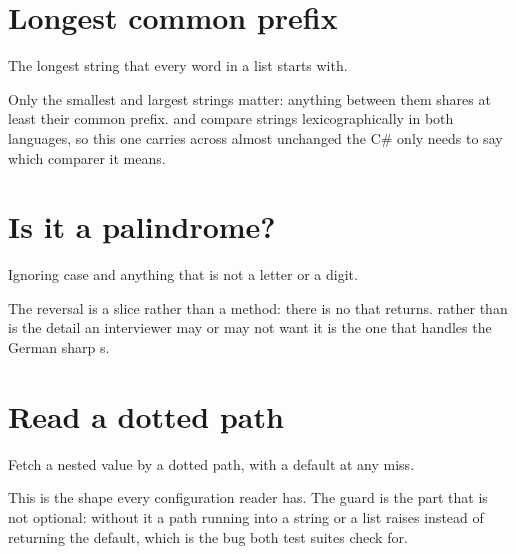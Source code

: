 \section{Longest common prefix}
\label{sec:appD-prefix}

\noindent
The longest string that every word in a list starts with.



\noindent
Only the smallest and largest strings matter: anything between them shares at least their common prefix.  and  compare strings lexicographically in both languages, so this one carries across almost unchanged \dash{} the C\# only needs to say which comparer it means.

\section{Is it a palindrome?}
\label{sec:appD-palindrome}

\noindent
Ignoring case and anything that is not a letter or a digit.



\noindent
The reversal is a slice rather than a method: there is no  that returns.  rather than  is the detail an interviewer may or may not want \dash{} it is the one that handles the German sharp s.

\section{Read a dotted path}
\label{sec:appD-deep-get}

\noindent
Fetch a nested value by a dotted path, with a default at any miss.



\noindent
This is the shape every configuration reader has. The  guard is the part that is not optional: without it a path running into a string or a list raises  instead of returning the default, which is the bug both test suites check for.

